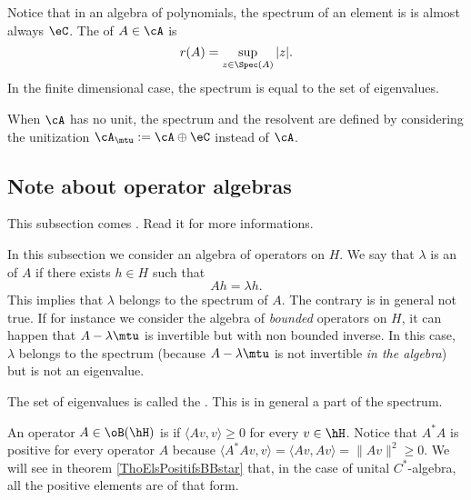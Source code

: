 Notice that in an algebra of polynomials, the spectrum of an element is is almost always $\eC$. The  of $A\in\cA$ is 
\begin{equation}
   r(A)=\sup_{z\in\Spec(A)}|z|.
\end{equation} \label{def:spectre}
In the finite dimensional case, the spectrum is equal to the set of eigenvalues.

\begin{remark}
When $\cA$ has no unit, the spectrum and the resolvent are defined by considering the unitization $\cA_{\mtu}:=\cA\oplus\eC$ instead of $\cA$.
\end{remark}

\subsection{Note about operator algebras}

This subsection comes . Read it for more informations.

In this subsection we consider an algebra of operators on \( H\). We say that \( \lambda\) is an  of \( A\) if there exists \( h\in H\) such that
\begin{equation}
    Ah=\lambda h.
\end{equation}
This implies that \( \lambda\) belongs to the spectrum of \( A\). The contrary is in general not true. If for instance we consider the algebra of \emph{bounded} operators on \( H\), it can happen that \( A-\lambda\mtu\) is invertible but with non bounded inverse. In this case, \( \lambda\) belongs to the spectrum (because \( A-\lambda\mtu\) is not invertible \emph{in the algebra}) but is not an eigenvalue.

The set of eigenvalues is called the . This is in general a part of the spectrum.

An operator $A\in\oB(\hH)$ is  if $\langle Av, v\rangle \geq 0$ for every $v\in \hH$. Notice that $A^*A$ is positive for every operator $A$ because $\langle A^*Av, v\rangle =\langle Av, Av\rangle =\| Av \|^2\geq 0$. We will see in theorem \ref{ThoElsPositifsBBstar} that, in the case of unital $C^*$-algebra, all the positive elements are of that form. 


